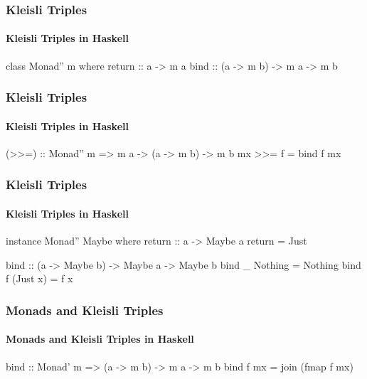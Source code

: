 \documentclass{beamer}
\begin{document}

\begin{frame}[fragile]
  \frametitle{Kleisli Triples}
  \framesubtitle{Kleisli Triples in Haskell}

  \begin{definition}
    \begin{code}
class Monad'' m where
  return :: a -> m a
  bind   :: (a -> m b) -> m a -> m b
    \end{code}
  \end{definition}

\end{frame}


\begin{frame}[fragile]
  \frametitle{Kleisli Triples}
  \framesubtitle{Kleisli Triples in Haskell}

  \begin{block}{ \UseVerb{=} }
    \begin{code}
(>>=) :: Monad'' m => m a -> (a -> m b) -> m b
mx >>= f = bind f mx
    \end{code}
  \end{block}

\end{frame}


\begin{frame}[fragile]
  \frametitle{Kleisli Triples}
  \framesubtitle{Kleisli Triples in Haskell}

  \begin{example}
    \begin{code}
instance Monad'' Maybe where
  return :: a -> Maybe a
  return = Just

  bind :: (a -> Maybe b) -> Maybe a -> Maybe b
  bind _ Nothing  = Nothing
  bind f (Just x) = f x
    \end{code}
  \end{example}

\end{frame}


\begin{frame}[fragile]
  \frametitle{Monads and Kleisli Triples}
  \framesubtitle{Monads and Kleisli Triples in Haskell}

  \begin{block}{ \UseVerb{=} }
    \begin{code}
bind :: Monad' m => (a -> m b) -> m a -> m b
bind f mx = join (fmap f mx)
    \end{code}
  \end{block}

\end{frame}
\end{document}
